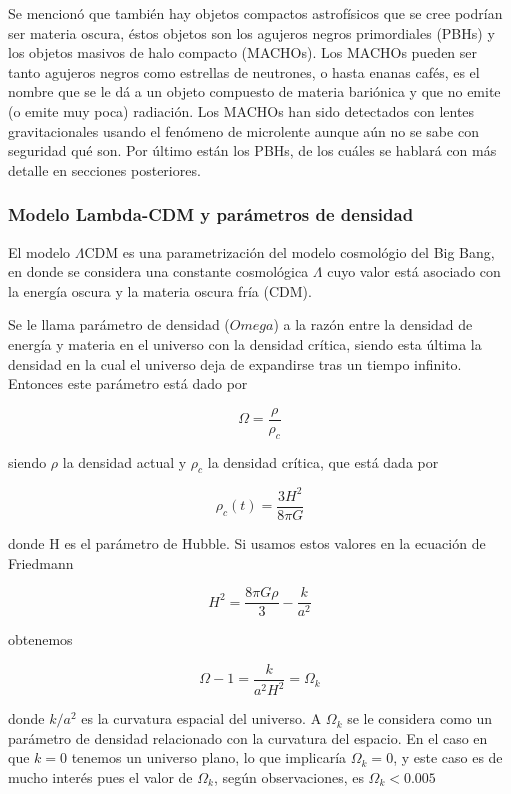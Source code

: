 \documentclass{article}
\begin{document}
Se mencion\'o que tambi\'en hay objetos compactos astrof\'isicos que se cree podr\'ian ser materia oscura, \'estos objetos son los agujeros negros primordiales (PBHs) y los objetos masivos de halo compacto (MACHOs). Los MACHOs pueden ser tanto agujeros negros como estrellas de neutrones, o hasta enanas caf\'es, es el nombre que se le d\'a a un objeto compuesto de materia bari\'onica y que no emite (o emite muy poca) radiaci\'on. Los MACHOs han sido detectados con lentes gravitacionales usando el fen\'omeno de microlente aunque a\'un no se sabe con seguridad qu\'e son. Por \'ultimo est\'an los PBHs, de los cu\'ales se hablar\'a con m\'as detalle en secciones posteriores.

\subsubsection*{Modelo Lambda-CDM y par\'ametros de densidad}
El modelo $\Lambda$CDM es una parametrizaci\'on del modelo cosmol\'ogio del Big Bang, en donde se considera una constante cosmol\'ogica $\Lambda$ cuyo valor est\'a asociado con la energ\'ia oscura y la materia oscura fr\'ia (CDM).

Se le llama par\'ametro de densidad ($Omega$) a la raz\'on entre la densidad de energ\'ia y materia en el universo con la densidad cr\'itica, siendo esta \'ultima la densidad en la cual el universo deja de expandirse tras un tiempo infinito. Entonces este par\'ametro est\'a dado por

\begin{equation}
\Omega=\frac{\rho}{\rho_c}
\end{equation} 

siendo $\rho$ la densidad actual y $\rho_c$ la densidad cr\'itica, que est\'a dada por 

\begin{equation}
\rho_c(t)=\frac{3H^2}{8\pi G}
\end{equation}

donde H es el par\'ametro de Hubble. Si usamos estos valores en la ecuaci\'on de Friedmann 

\begin{equation}
H^2=\frac{8\pi G\rho}{3}-\frac{k}{a^2}
\end{equation}

obtenemos

\begin{equation}
\Omega -1=\frac{k}{a^2 H^2}=\Omega_k
\end{equation}

donde $k/a^2$ es la curvatura espacial del universo. A $\Omega_k$ se le considera como un par\'ametro de densidad relacionado con la curvatura del espacio. En el caso en que $k=0$ tenemos un universo plano, lo que implicar\'ia $\Omega_k=0$, y este caso es de mucho inter\'es pues el valor de $\Omega_k$, seg\'un observaciones, es $\Omega_k<0.005$
\end{document}
